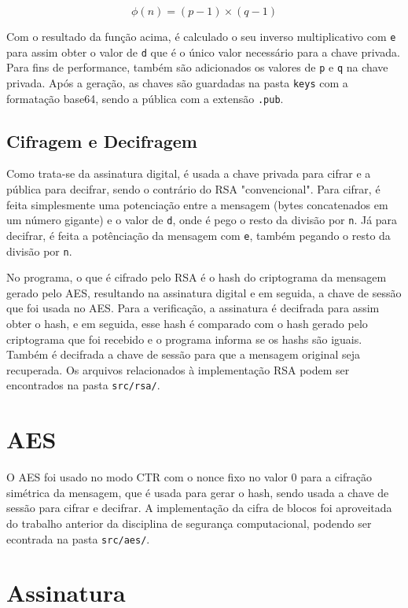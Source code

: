 \documentclass[12pt]{article}
\begin{document}
\[
    \phi(n) = (p-1) \times (q-1)
\]

Com o resultado da função acima, é calculado o seu inverso multiplicativo com \texttt{e} para assim obter o valor de \texttt{d} que é o único valor necessário para a chave privada. Para fins de performance, também são adicionados os valores de \texttt{p} e \texttt{q} na chave privada. Após a geração, as chaves são guardadas na pasta \texttt{keys} com a formatação base64, sendo a pública com a extensão \texttt{.pub}.

\subsection{Cifragem e Decifragem}

Como trata-se da assinatura digital, é usada a chave privada para cifrar e a pública para decifrar, sendo o contrário do RSA "convencional". Para cifrar, é feita simplesmente uma potenciação entre a mensagem (bytes concatenados em um número gigante) e o valor de \texttt{d}, onde é pego o resto da divisão por \texttt{n}. Já para decifrar, é feita a potênciação da mensagem com \texttt{e}, também pegando o resto da divisão por \texttt{n}.

No programa, o que é cifrado pelo RSA é o hash do criptograma da mensagem gerado pelo AES, resultando na assinatura digital e em seguida, a chave de sessão que foi usada no AES. Para a verificação, a assinatura é decifrada para assim obter o hash, e em seguida, esse hash é comparado com o hash gerado pelo criptograma que foi recebido e o programa informa se os hashs são iguais. Também é decifrada a chave de sessão para que a mensagem original seja recuperada. Os arquivos relacionados à implementação RSA podem ser encontrados na pasta \texttt{src/rsa/}.

\section{AES}

O AES foi usado no modo CTR com o nonce fixo no valor 0 para a cifração simétrica da mensagem, que é usada para gerar o hash, sendo usada a chave de sessão para cifrar e decifrar. A implementação da cifra de blocos foi aproveitada do trabalho anterior da disciplina de segurança computacional, podendo ser econtrada na pasta \texttt{src/aes/}.

\section{Assinatura}
\end{document}
